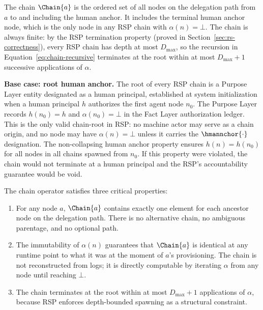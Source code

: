 The chain $\Chain{a}$ is the ordered set of all nodes on the delegation path from $a$ to and including the human anchor. It includes the terminal human anchor node, which is the only node in any RSP chain with $\alpha(n) = \bot$. The chain is always finite: by the RSP termination property (proved in Section~\ref{sec:rs-correctness}), every RSP chain has depth at most $D_{\max}$, so the recursion in Equation~\ref{eq:chain-recursive} terminates at the root within at most $D_{\max} + 1$ successive applications of $\alpha$.

\bigskip
\noindent\textbf{Base case: root human anchor.} The root of every RSP chain is a Purpose Layer entity designated as a human principal, established at system initialization when a human principal $h$ authorizes the first agent node $n_0$. The Purpose Layer records $h(n_0) = h$ and $\alpha(n_0) = \bot$ in the Fact Layer authorization ledger. This is the only valid chain-root in RSP: no machine actor may serve as a chain origin, and no node may have $\alpha(n) = \bot$ unless it carries the $\hmannchor{\cdot}$ designation. The non-collapsing human anchor property ensures $h(n) = h(n_0)$ for all nodes in all chains spawned from $n_0$. If this property were violated, the chain would not terminate at a human principal and the RSP's accountability guarantee would be void.

The chain operator satisfies three critical properties:

\begin{enumerate}
    \item[(C1) \textbf{Uniqueness}] For any node $a$, $\Chain{a}$ contains exactly one element for each ancestor node on the delegation path. There is no alternative chain, no ambiguous parentage, and no optional path.

    \item[(C2) \textbf{Determinism}] The immutability of $\alpha(n)$ guarantees that $\Chain{a}$ is identical at any runtime point to what it was at the moment of $a$'s provisioning. The chain is not reconstructed from logs; it is directly computable by iterating $\alpha$ from any node until reaching $\bot$.

    \item[(C3) \textbf{Finite depth}] The chain terminates at the root within at most $D_{\max} + 1$ applications of $\alpha$, because RSP enforces depth-bounded spawning as a structural constraint.
\end{enumerate}

